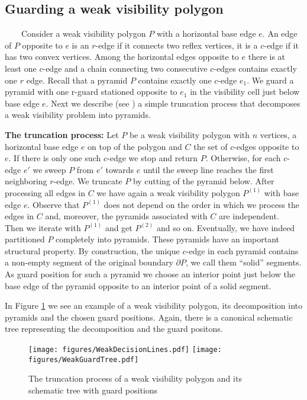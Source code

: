 \documentclass[a4paper,USenglish,numberwithinsect]{lipics}
\theoremstyle{plain}
\begin{document}
\subsection{Guarding  a weak visibility polygon}

\ \ \ \ Consider  a weak visibility polygon $P$ with a horizontal base edge $e$.
An edge of $P$ opposite to $e$ is an $r$-edge if it connects two reflex vertices, it is a
$c$-edge if it has two convex vertices. Among the horizontal edges opposite
to $e$ there is at least one $c$-edge and  a chain connecting two consecutive 
$c$-edges contains exactly one $r$ edge. Recall that a pyramid $P$
contains exactly one $c$-edge $e_1$. We guard a pyramid with one r-guard
stationed opposite to  $e_1$
 in the visibility cell just below base edge $e$. Next we describe (see
\cite{BS}) a simple truncation process that decomposes a weak
visibility problem into pyramids.

{\bf The truncation process:}
Let $P$ be a weak visibility polygon with $n$ vertices, a  horizontal  base
edge $e$ on top of the polygon and $C$ the set of $c$-edges opposite to $e$. If there is only
one such $c$-edge we stop and return $P$. Otherwise, for each $c$-edge $e'$ we
sweep $P$ from $e'$ 
towards $e$ until the sweep line reaches the first neighboring  $r$-edge.  
We truncate $P$ by cutting of the pyramid below. After processing all
edges in $C$ we have again a weak visibility polygon $P^{(1)}$ with base
edge $e$. Observe that $P^{(1)}$ does not depend on the order in which
we process the edges in $C$
 and, moreover, the pyramids associated with $C$ are independent.\\
Then we iterate with $P^{(1)}$ and get $P^{(2)}$ and so on. Eventually, we have indeed
partitioned $P$ completely into pyramids. These pyramids have an
important structural property. By construction, the unique $c$-edge in
each pyramid contains a non-empty segment of the original boundary
$\partial P$, we call them ``solid'' segments. As guard position for
such a pyramid we choose an interior point  just below the base edge of
the pyramid opposite to an interior point of a solid segment.  
 
In Figure \ref{covGuards} we see an example of a weak visibility
polygon, its decomposition into pyramids and the chosen guard positions.
Again, there is a canonical schematic tree representing the
decomposition and the guard positons.



\begin{figure}
\centering
\texttt{[image: figures/WeakDecisionLines.pdf]}\quad\quad
\texttt{[image: figures/WeakGuardTree.pdf]}
\caption{The truncation  process of a  weak visibility polygon and its
schematic tree with guard positions}
\label{covGuards}
\end{figure}
\end{document}
